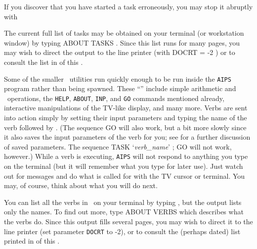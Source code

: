      If you discover that you have started a task erroneously, you may
stop it abruptly with
\btd
{}
\etd
{}

     The current full list of tasks may be obtained on your terminal
(or workstation window) by typing {\us ABOUT \qs TASKS \hbox{\CR}}.
Since this list runs for many pages, you may wish to direct the output
to the line printer (with {\us DOCRT = -2 \CR}) or to consult the
list in  of this \Cookbook.


     Some of the smaller \AIPS\ utilities run quickly enough to be run
inside the {\tt AIPS} program rather than being spawned.  These
``'' include simple arithmetic and \POPS\
operations, the {\tt HELP}, {\tt ABOUT}, {\tt INP}, and {\tt GO}
commands mentioned already, interactive manipulations of the TV-like
display, and many more.  Verbs are sent into action simply by setting
their input parameters and typing the name of the verb followed by
\hbox{\CR}. (The sequence {\us GO \qs {\it verb\_name\/} \CR} will also
work, but a bit more slowly since it also saves the input parameters
of the verb for you; see \Sec{inputs} for a further discussion of saved
parameters. The sequence {\us TASK \qs `{\it verb\_name\/}' ;  \qs GO
\CR} will not work, however.)  While a verb is executing, {\tt AIPS}
will not respond to anything you type on the terminal (but it will
remember what you type for later use).  Just watch out for messages
and do what is called for with the TV cursor or terminal.  You may, of
course, think about what you will do next.

     You can list all the verbs in \AIPS\ on your terminal by typing
{\us \tndx{HELP VERBS} \CR}, but the output lists only the names.  To
find out more, type {\us ABOUT \qs VERBS \CR} which describes what the
verbs do.  Since this output fills several pages, you may wish to
direct it to the line printer (set parameter {\tt DOCRT} to -2), or to
consult the (perhaps dated) list printed in \Rchap{list} of this
\Cookbook.

